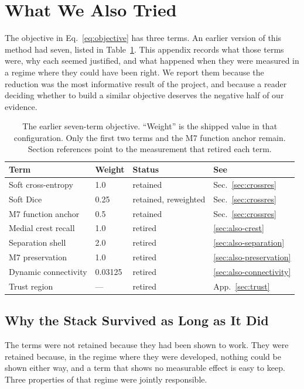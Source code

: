 \section{What We Also Tried}
\label{sec:also-tried}

The objective in Eq.~\ref{eq:objective} has three terms.
An earlier version of this method had seven, listed in
Table~\ref{tab:retired}.
This appendix records what those terms were, why each seemed justified, and
what happened when they were measured in a regime where they could have been
right.
We report them because the reduction was the most informative result of the
project, and because a reader deciding whether to build a similar objective
deserves the negative half of our evidence.

\begin{table}[t]
\caption{The earlier seven-term objective. ``Weight'' is the shipped value in
that configuration. Only the first two terms and the M7 function anchor remain.
Section references point to the measurement that retired each term.}
\label{tab:retired}
\centering
\small
\begin{tabular}{llll}
\toprule
Term & Weight & Status & See \\
\midrule
Soft cross-entropy & 1.0 & retained & Sec.~\ref{sec:crossres} \\
Soft Dice & 0.25 & retained, reweighted & Sec.~\ref{sec:crossres} \\
M7 function anchor & 0.5 & retained & Sec.~\ref{sec:crossres} \\
Medial crest recall & 1.0 & retired & \ref{sec:also-crest} \\
Separation shell & 2.0 & retired & \ref{sec:also-separation} \\
M7 preservation & 1.0 & retired & \ref{sec:also-preservation} \\
Dynamic connectivity & 0.03125 & retired & \ref{sec:also-connectivity} \\
\midrule
Trust region & --- & retired & App.~\ref{sec:trust} \\
\bottomrule
\end{tabular}
\end{table}

\subsection{Why the Stack Survived as Long as It Did}
\label{sec:also-regime}

The terms were not retained because they had been shown to work.
They were retained because, in the regime where they were developed, nothing
could be shown either way, and a term that shows no measurable effect is easy to
keep.
Three properties of that regime were jointly responsible.

